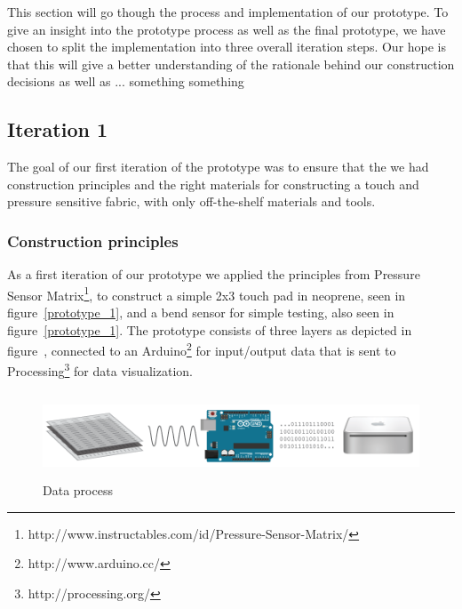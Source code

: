 This section will go though the process and implementation of our prototype.
To give an insight into the prototype process as well as the final prototype, we have chosen to split the implementation into three overall iteration steps.
Our hope is that this will give a better understanding of the rationale behind our construction decisions as well as ... something something 


\subsection{Iteration 1}
The goal of our first iteration of the prototype was to ensure that the we had construction principles and the right materials for constructing a touch and pressure sensitive fabric, with only off-the-shelf materials and tools.

\subsubsection{Construction principles}
As a first iteration of our prototype we applied the principles from Pressure Sensor Matrix\footnote{http://www.instructables.com/id/Pressure-Sensor-Matrix/}, to construct a simple 2x3 touch pad in neoprene, seen in figure~\ref{prototype_1}, and a bend sensor for simple testing, also seen in figure~\ref{prototype_1}.
The prototype consists of three layers as depicted in figure~, connected to an Arduino\footnote{http://www.arduino.cc/} for input/output data that is sent to Processing\footnote{http://processing.org/} for data visualization.

\begin{figure}[h]
  \centering
      \includegraphics[height=1in]{figures/touch/process}
  \caption{Data process}
   \label{data-process}
\end{figure}

